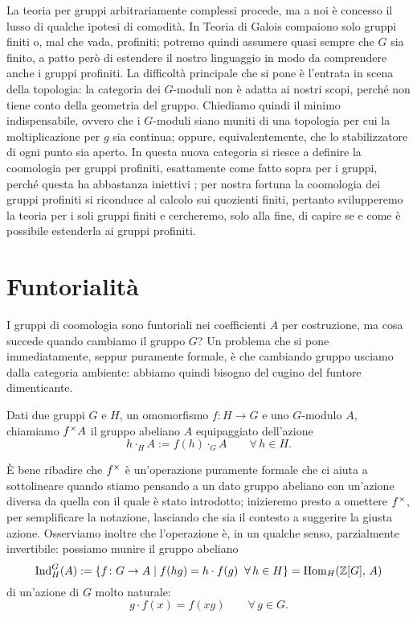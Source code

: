 
\begin{profinite}
	La teoria per gruppi arbitrariamente complessi procede, ma a noi è concesso il lusso di qualche ipotesi di comodità. In Teoria di Galois compaiono solo gruppi finiti o, mal che vada, profiniti; potremo quindi assumere quasi sempre che $ G $ sia finito, a patto però di estendere il nostro linguaggio in modo da comprendere anche i gruppi profiniti. La difficoltà principale che si pone è l'entrata in scena della topologia: la categoria dei $ G $-moduli non è adatta ai nostri scopi, perché non tiene conto della geometria del gruppo. Chiediamo quindi il minimo indispensabile, ovvero che i $ G $-moduli siano muniti di una topologia per cui la moltiplicazione per $ g $ sia continua; oppure, equivalentemente, che lo stabilizzatore di ogni punto sia aperto. In questa nuova categoria si riesce a definire la coomologia per gruppi profiniti, esattamente come fatto sopra per i gruppi, perché questa ha abbastanza iniettivi \cite[Lemma 6.11.10]{Weibel}; per nostra fortuna la coomologia dei gruppi profiniti si riconduce al calcolo sui quozienti finiti, pertanto svilupperemo la teoria per i soli gruppi finiti e cercheremo, solo alla fine, di capire se e come è possibile estenderla ai gruppi profiniti.
\end{profinite}

\section{Funtorialità}
I gruppi di coomologia sono funtoriali nei coefficienti $ A $ per costruzione, ma cosa succede quando cambiamo il gruppo $ G $? Un problema che si pone immediatamente, seppur puramente formale, è che cambiando gruppo usciamo dalla categoria ambiente: abbiamo quindi bisogno del cugino del funtore dimenticante.

\begin{definition}
	Dati due gruppi $ G $ e $ H $, un omomorfismo $ f \colon H \to G $ e uno $ G $-modulo $ A $, chiamiamo $ f^\times A $ il gruppo abeliano $ A $ equipaggiato dell'azione
	\[ h \cdot_{H} A := f(h) \cdot_{G} A \qquad \forall\, h \in H. \]
\end{definition}

È bene ribadire che $ f^\times $ è un'operazione puramente formale che ci aiuta a sottolineare quando stiamo pensando a un dato gruppo abeliano con un'azione diversa da quella con il quale è stato introdotto; inizieremo presto a omettere $ f^\times $, per semplificare la notazione, lasciando che sia il contesto a suggerire la giusta azione. Osserviamo inoltre che l'operazione è, in un qualche senso, parzialmente invertibile: possiamo munire il gruppo abeliano
\[ \operatorname{Ind}_{H}^G(A) := \{ f \colon G \to A \mid f(hg) = h \cdot f(g) \;\; \forall\, h \in H \} = \operatorname{Hom}_{H}(\mathbb{Z}[G], \, A) \]
di un'azione di $ G $ molto naturale:
\[g \cdot f(x) = f(xg) \qquad\forall\, g \in G. \]

